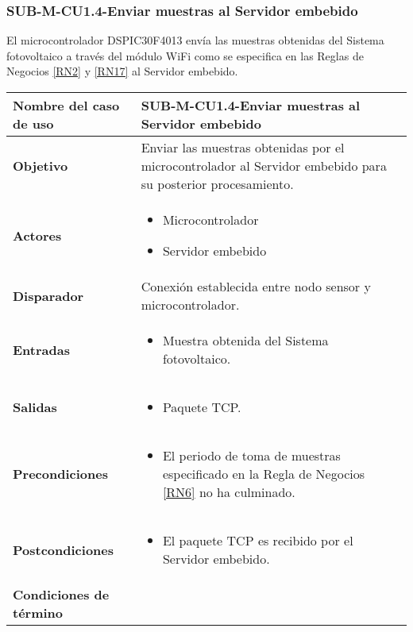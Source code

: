 \subsubsection{SUB-M-CU1.4-Enviar muestras al Servidor embebido}\label{SUB-M-CU1.4}
El microcontrolador DSPIC30F4013 envía las muestras obtenidas del Sistema fotovoltaico a través del módulo WiFi como se especifica en las Reglas de Negocios \ref{RN2} y \ref{RN17} al Servidor embebido.
\begin{longtable}{|J{5cm}|J{10.3cm}|}
	\hline
	\textbf{Nombre del caso de uso} &
		SUB-M-CU1.4-Enviar muestras al Servidor embebido \\ \hline
	\textbf{Objetivo} &
		Enviar las muestras obtenidas por el microcontrolador al Servidor embebido para su posterior procesamiento. \\ \hline
	\textbf{Actores} &
	    \begin{itemize}
		    \item Microcontrolador
		    \item Servidor embebido
		\end{itemize}\\ \hline 
	\textbf{Disparador} & 
		Conexión establecida entre nodo sensor y microcontrolador.\\ \hline
	\textbf{Entradas} & %
		\begin{itemize}%
				\item Muestra obtenida del Sistema fotovoltaico.
		\end{itemize}
		\\ \hline 
	\textbf{Salidas} & 
	    \begin{itemize}%
	        \item Paquete TCP.
	    \end{itemize}\\ \hline
	\textbf{Precondiciones} & 
		\begin{itemize}
		    \item El periodo de toma de muestras especificado en la Regla de Negocios \ref{RN6} no ha culminado.
		\end{itemize}\\ \hline
	\textbf{Postcondiciones} &
		\begin{itemize}
			\item El paquete TCP es recibido por el Servidor embebido.
		\end{itemize} \\ \hline
	\textbf{Condiciones de término} & 

\end{longtable}
